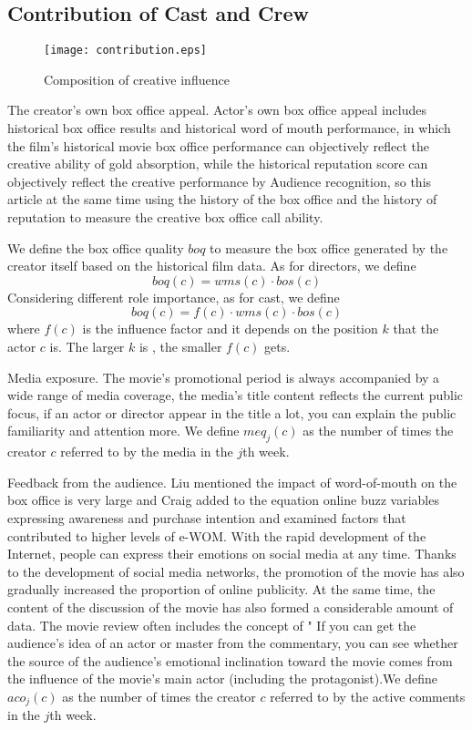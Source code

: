 \subsection{Contribution of Cast and Crew}
\begin{figure}[!htbp]
\centering
\texttt{[image: contribution.eps]}
\caption{Composition of creative influence}
\label{fig:influ}
\end{figure}
\par The creator's own box office appeal. Actor's own box office appeal includes historical box office results and historical word of mouth performance, in which the film's historical movie box office performance can objectively reflect the creative ability of gold absorption, while the historical reputation score can objectively reflect the creative performance by Audience recognition, so this article at the same time using the history of the box office and the history of reputation to measure the creative box office call ability.
\par We define the box office quality $boq$ to measure the box office generated by the creator itself based on the historical film data. 
As for directors, we define 
\begin{equation}
   boq(c)=wms(c)\cdot bos(c)
\end{equation}
Considering different role importance, as for cast, we define 
\begin{equation}
    boq(c) = f(c)\cdot wms(c)\cdot bos(c)
\end{equation}
where $f(c)$ is the influence factor and it depends on the position $k$ that the actor $c$ is. The larger $k$ is , the smaller $f(c)$ gets.
\par Media exposure. The movie's promotional period is always accompanied by a wide range of media coverage, the media's title content reflects the current public focus, if an actor or director appear in the title a lot, you can explain the public familiarity and attention more. We define $meq_j(c)$ as the number of times the creator $c$ referred to by the media in the $j$th week.
\par Feedback from the audience. Liu \cite{liu2006word} mentioned the impact of word-of-mouth on the box office is very large and Craig \cite{craig2015word}added to the equation online buzz variables expressing awareness and purchase intention and examined factors that contributed to higher levels of e-WOM. With the rapid development of the Internet, people can express their emotions on social media at any time. Thanks to the development of social media networks, the promotion of the movie has also gradually increased the proportion of online publicity. At the same time, the content of the discussion of the movie has also formed a considerable amount of data. The movie review often includes the concept of " If you can get the audience's idea of ​​an actor or master from the commentary, you can see whether the source of the audience's emotional inclination toward the movie comes from the influence of the movie's main actor (including the protagonist).We define $aco_j(c)$ as the number of times the creator $c$ referred to by the active comments in the $j$th week.
